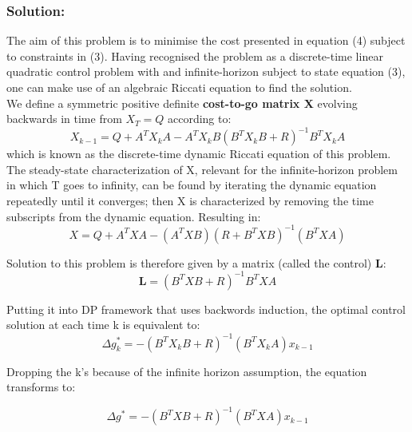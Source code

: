\documentclass[11pt]{article}
\begin{document}
\subsubsection*{Solution:}
The aim of this problem is to minimise the cost presented in equation (4) subject to constraints in (3). Having recognised the problem as a discrete-time linear quadratic control problem with and infinite-horizon subject to state equation (3), one can make use of an algebraic Riccati equation to find the solution.\\

We define a symmetric positive definite \textbf{cost-to-go matrix X} evolving backwards in time from $X _ { T } = Q$ according to:
\begin{equation} 
X _ { k - 1 } = Q + A ^ { T } X _ { k } A - A ^ { T } X _ { k } B \left( B ^ { T } X _ { k } B + R \right) ^ { - 1 } B ^ { T } X _ { k } A
\end{equation}
which is known as the discrete-time dynamic Riccati equation of this problem. The steady-state characterization of X, relevant for the infinite-horizon problem in which T goes to infinity, can be found by iterating the dynamic equation repeatedly until it converges; then X is characterized by removing the time subscripts from the dynamic equation. Resulting in:
\begin{equation}
X = Q+ A ^ { T } X A - \left( A ^ { T } X B \right) \left( R + B ^ { T } X B \right) ^ { - 1 } \left( B ^ { T } X A \right)
\end{equation}


Solution to this problem is therefore given by a matrix (called the control) $\mathbf{L}$:
\begin{equation}
\mathbf{L} = \left(B ^ { T } X B +R \right) ^ { - 1 } B ^ { T } X A %
\end{equation}

Putting it into DP framework that uses backwords induction, the optimal control solution at each time k is equivalent to:
\begin{equation} 
\Delta g _ { k } ^ { * } = - \left( B ^ { T } X _ { k } B + R \right) ^ { - 1 } \left( B ^ { T } X _ { k } A \right) x _ { k - 1 }
\end{equation}

Dropping the k's because of the infinite horizon assumption, the equation transforms to:

\begin{equation} 
\Delta g  ^ { * } = - \left( B ^ { T } X  B + R \right) ^ { - 1 } \left( B ^ { T } X  A \right) x _ { k - 1 }
\end{equation}
\end{document}
